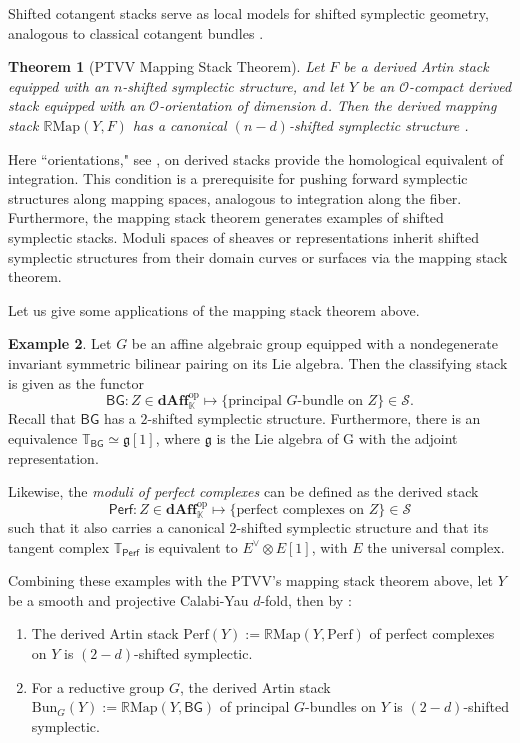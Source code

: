 \documentclass[reqno]{amsart}
\newtheorem{theorem}{Theorem}[section]
\theoremstyle{definition}
\newtheorem{example}[theorem]{Example}
\theoremstyle{remark}
\newcommand{\cO}{\mathcal{O}}
\newcommand{\K}{\mathbb{K}}
\newcommand{\R}{{\mathbb R}}
\begin{document}
{Shifted cotangent stacks serve as local models for shifted symplectic
geometry, analogous to classical cotangent bundles \cite[Section 2.1]{Calaque}.

\begin{theorem}[PTVV Mapping Stack Theorem] \label{thm:ptvv}
  Let $F$ be a derived Artin stack equipped with an $n$-shifted
  symplectic structure, and let $Y$ be an $\cO$-compact derived stack
  equipped with an $\cO$-orientation of dimension $d$. Then the
  derived mapping stack  $\mathbb{R}\mathrm{Map}(Y, F)$ 
  has    a canonical $(n-d)$-shifted symplectic structure \cite[Theorem 2.5]{PTVV}.
\end{theorem} Here ``orientations," see \cite[Definition 2.4]{PTVV}, on derived stacks provide the homological equivalent of integration. This condition is a
prerequisite for pushing forward symplectic structures along mapping
spaces, analogous to integration along the fiber.
Furthermore, the mapping stack theorem generates examples of
shifted symplectic stacks. Moduli spaces of sheaves or
representations inherit shifted
symplectic structures from their domain curves or surfaces via the
mapping stack theorem. 
\vspace{0.1in}

Let us give some applications of the mapping stack theorem above.
\begin{example}
   Let $ G $ be an affine algebraic
    group  equipped with a nondegenerate invariant symmetric bilinear pairing  on its Lie algebra. Then the classifying stack is given as the functor   \[
\mathsf{B G} : Z \in \mathbf{dAff}_\K^{\mathrm{op}} \longmapsto 
\{\text{principal } G\text{-bundle on } Z\} 
\in \mathcal{S}.
\]Recall that $\mathsf{B G}$ has a \(2\)-shifted symplectic structure. Furthermore, there is an equivalence $\mathbb{T}_{\mathsf{B G}}\simeq \mathfrak{g}[1]$, where $\mathfrak{g}$ is the Lie algebra of G with the adjoint representation. 

Likewise, the \textit{moduli of perfect complexes} can be defined as the derived stack \[
\mathsf{Perf} : Z \in \mathbf{dAff}_\K^{\mathrm{op}} \longmapsto 
\{\text{perfect complexes on }   Z\} 
\in \mathcal{S}
\] such that it also carries a canonical \(2\)-shifted symplectic structure and that its tangent complex $\mathbb{T_{\mathsf{Perf}}}$ is equivalent to $E^{\vee} \otimes E[1]$, with $E$ the universal complex.

Combining these examples with the PTVV's mapping stack theorem above, let $Y$ be a smooth and projective Calabi-Yau $d$-fold, then by \cite{PTVV}:
\begin{enumerate}
  \item The derived Artin stack
    \( \mathrm{Perf}(Y) :=  \R\mathrm{Map}(Y, \mathrm{Perf}) \)
    of perfect complexes on $Y$ is \((2-d)\)-shifted symplectic.
    \item For a reductive group $G$, the derived Artin stack
    \( \mathrm{Bun}_G(Y) := \R\mathrm{Map}(Y, \mathsf{B G}) \)
    of principal $G$-bundles on $Y$ is \((2-d)\)-shifted symplectic.
\end{enumerate}
\end{example}

}
\end{document}
